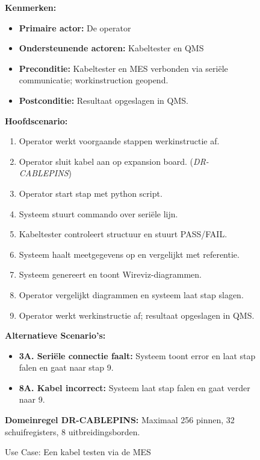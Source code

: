 \begin{figure}[!ht]
    \centering
    \captionsetup{width=0.8\textwidth}
    \begin{tcolorbox}[colback=white, colframe=odisee-navy, title=\textbf{Use Case: Een kabel testen via \gls{MES}}, sharp corners, label={uc:MES}]
        \textbf{Kenmerken:}
        \begin{itemize}[noitemsep, label={}]
            \item \textbf{Primaire actor:} De operator
            \item \textbf{Ondersteunende actoren:} Kabeltester en \gls{QMS}
            \item \textbf{Preconditie:} Kabeltester en \gls{MES} verbonden via seriële communicatie; workinstruction geopend.
            \item \textbf{Postconditie:} Resultaat opgeslagen in \gls{QMS}.
        \end{itemize}
        
        \textbf{Hoofdscenario:}
        \begin{enumerate}[noitemsep]
            \item Operator werkt voorgaande stappen werkinstructie af.
            \item Operator sluit kabel aan op expansion board. (\textit{DR-CABLEPINS})
            \item Operator start stap met python script.
            \item Systeem stuurt commando over seriële lijn.
            \item Kabeltester controleert structuur en stuurt PASS/FAIL.
            \item Systeem haalt meetgegevens op en vergelijkt met referentie.
            \item Systeem genereert en toont Wireviz-diagrammen.
            \item Operator vergelijkt diagrammen en systeem laat stap slagen.
            \item Operator werkt werkinstructie af; resultaat opgeslagen in \gls{QMS}.
        \end{enumerate}
        
        \textbf{Alternatieve Scenario's:}
        \begin{itemize}[noitemsep]
            \item \textbf{3A. Seriële connectie faalt:} Systeem toont error en laat stap falen en gaat naar stap 9.
            \item \textbf{8A. Kabel incorrect:} Systeem laat stap falen en gaat verder naar 9.
        \end{itemize}
        
        \tcblower 
        \textbf{Domeinregel DR-CABLEPINS:} Maximaal 256 pinnen, 32 schuifregisters, 8 uitbreidingsborden.
    \end{tcolorbox}
    \caption[Use Case \gls{MES}]{Use Case: Een kabel testen via de \gls{MES}}
    \label{uc:MES} 
\end{figure}


